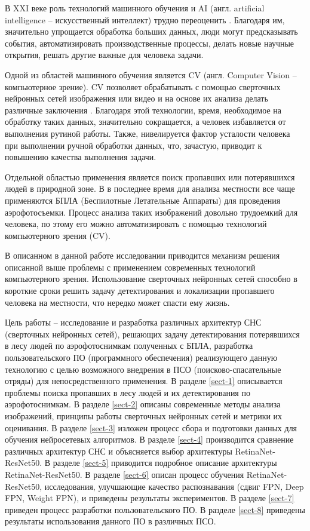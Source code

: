 
В XXI веке роль технологий машинного обучения и AI (англ. artificial intelligence -- искусственный интеллект) трудно переоценить \cite{lib-sidorenko}. Благодаря им, значительно упрощается обработка больших данных, люди могут предсказывать события, автоматизировать производственные процессы, делать новые научные открытия, решать другие важные для человека задачи.

Одной из областей машинного обучения является CV (англ. Computer Vision -- компьютерное зрение). CV позволяет обрабатывать с помощью сверточных нейронных сетей изображения или видео и на основе их анализа делать различные заключения \cite{lib-deep-learning-book}. Благодаря этой технологии, время, необходимое на обработку таких данных, значительно сокращается, а человек избавляется от выполнения рутиной работы. Также, нивелируется фактор усталости человека при выполнении ручной обработки данных, что, зачастую, приводит к повышению качества выполнения задачи.

Отдельной областью применения является поиск пропавших или потерявшихся людей в природной зоне. В в последнее время для анализа местности все чаще применяются БПЛА (Беспилотные Летательные Аппараты) для проведения аэрофотосъемки. Процесс анализа таких изображений довольно трудоемкий для человека, по этому его можно автоматизировать с помощью технологий компьютерного зрения (CV). 

В описанном в данной работе исследовании приводится механизм решения описанной выше проблемы с применением современных технологий компьютерного зрения. Использование сверточных нейронных сетей способно в короткие сроки решить задачу детектирования и локализации пропавшего человека на местности, что нередко может спасти ему жизнь. 

Цель работы -- исследование и разработка различных архитектур СНС (сверточных нейронных сетей), решающих задачу детектирования потерявшихся в лесу людей по аэрофотоснимкам полученных с БПЛА, разработка пользовательского ПО (программного обеспечения) реализующего данную технологию с целью возможного внедрения в ПСО (поисково-спасательные отряды) для непосредственного применения. В разделе \ref{sect-1} описывается проблемы поиска пропавших в лесу людей и их детектирования по аэрофотоснимкам. В разделе \ref{sect-2} описаны современные методы анализа изображений, принципы работы сверточных нейронных сетей и метрики их оценивания. В разделе \ref{sect-3} изложен процесс сбора и подготовки данных для обучения нейросетевых алгоритмов. В разделе \ref{sect-4} производится сравнение различных архитектур СНС и объясняется выбор архитектуры RetinaNet-ResNet50. В разделе \ref{sect-5} приводится подробное описание архитектуры RetinaNet-ResNet50. В разделе \ref{sect-6} описан процесс обучения RetinaNet-ResNet50, исследования, улучшающие качество распознавания (сдвиг FPN, Deep FPN, Weight FPN), и приведены результаты экспериментов. В разделе \ref{sect-7} приведен процесс разработки пользовательского ПО. В разделе \ref{sect-8} приведены результаты использования данного ПО в различных ПСО.
\clearpage
